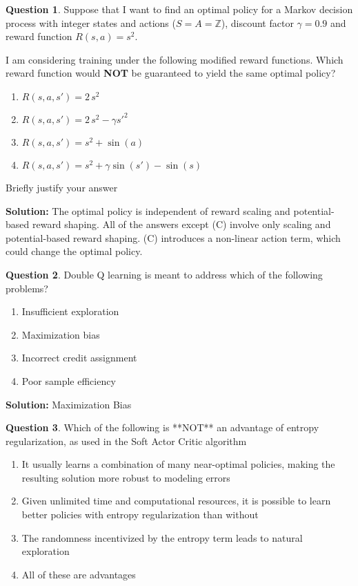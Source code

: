 \documentclass{article}
\theoremstyle{definition}
\newtheorem{question}{Question}
\begin{document}
\begin{question}
Suppose that I want to find an optimal policy for a Markov decision process with integer states and actions ($S=A=\mathbb{Z}$), discount factor $\gamma = 0.9$ and reward function $R(s, a) = s^2$.

I am considering training under the following modified reward functions. Which reward function would \textbf{NOT} be guaranteed to yield the same optimal policy?

\begin{enumerate}[label=(\Alph*)]
\item $R(s, a, s') = 2\,s^2$
\item $R(s, a, s') = 2\,s^2 - \gamma s'^2$
\item $R(s, a, s') = s^2 + \sin(a)$
\item $R(s, a, s') = s^2 + \gamma \sin(s') - \sin(s)$
\end{enumerate}

Briefly justify your answer
\end{question}

\noindent\textbf{Solution:}
The optimal policy is independent of reward scaling and potential-based reward shaping. All of the answers except (C) involve only scaling and potential-based reward shaping. (C) introduces a non-linear action term, which could change the optimal policy.

\begin{question}
Double Q learning is meant to address which of the following problems?

\begin{enumerate}[label=(\Alph*)]
\item Insufficient exploration
\item Maximization bias
\item Incorrect credit assignment
\item Poor sample efficiency
\end{enumerate}
\end{question}

\noindent\textbf{Solution:}
Maximization Bias

\begin{question}
Which of the following is **NOT** an advantage of entropy regularization, as used in the Soft Actor Critic algorithm

\begin{enumerate}[label=(\Alph*)]
\item It usually learns a combination of many near-optimal policies, making the resulting solution more robust to modeling errors
\item Given unlimited time and computational resources, it is possible to learn better policies with entropy regularization than without
\item The randomness incentivized by the entropy term leads to natural exploration
\item All of these are advantages
\end{enumerate}
\end{question}
\end{document}

